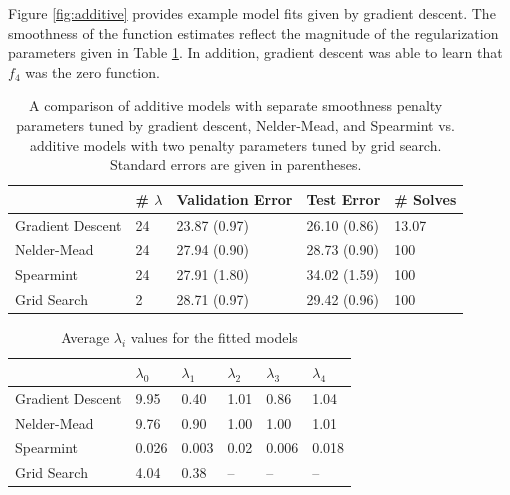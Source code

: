 \documentclass[12pt]{article}
\begin{document}
Figure \ref{fig:additive} provides example model fits given by gradient descent. The smoothness of the function estimates reflect the magnitude of the regularization parameters given in Table \ref{tab:additive}. In addition, gradient descent was able to learn that $f_4$ was the zero function.

\begin{table}
\caption {\label{tab:additive} A comparison of additive models with separate smoothness penalty parameters tuned by gradient descent, Nelder-Mead, and Spearmint vs. additive models with two penalty parameters tuned by grid search. Standard errors are given in parentheses.}
\centering
\begin{tabular}{| l | l | l | l | l | }
\hline
& \# $\lambda$ & Validation Error & Test Error & \# Solves\\
\hline
Gradient Descent & 24 & 23.87 (0.97) & 26.10 (0.86) & 13.07 \\
\hline
Nelder-Mead & 24 & 27.94 (0.90) & 28.73 (0.90) & 100 \\
\hline
Spearmint & 24 & 27.91 (1.80) & 34.02 (1.59) & 100 \\
\hline
Grid Search & 2 & 28.71 (0.97) & 29.42 (0.96) & 100 \\
\hline
\end{tabular}
\end{table}

\begin{table}
\caption {\label{tab:additive_average_lambda} Average $\lambda_i$ values for the fitted models}
\centering
\begin{tabular}{| l | l | l | l | l | l | }
\hline
& $\lambda_0$ & $\lambda_1$ & $\lambda_2$ & $\lambda_3$ & $\lambda_4$\\
\hline
Gradient Descent & 9.95 & 0.40 & 1.01 & 0.86 & 1.04 \\
\hline
Nelder-Mead & 9.76 & 0.90 & 1.00 & 1.00 & 1.01 \\
\hline
Spearmint & 0.026 & 0.003 & 0.02 & 0.006 & 0.018\\
\hline
Grid Search & 4.04 & 0.38 & -- & -- & -- \\
\hline
\end{tabular}
\end{table}
\end{document}
